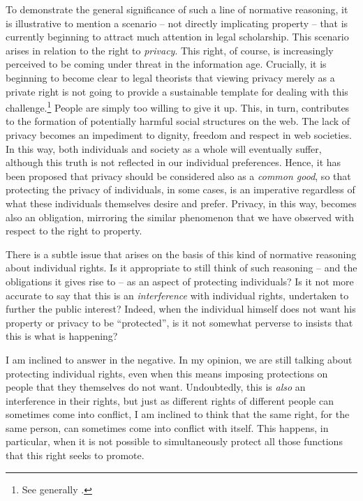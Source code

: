 To demonstrate the general significance of such a line of normative reasoning, it is illustrative to mention a scenario -- not directly implicating property -- that is currently beginning to attract much attention in legal scholarship. This scenario arises in relation to the right to {\it privacy}. This right, of course, is increasingly perceived to be coming under threat in the information age. Crucially, it is beginning to become clear to legal theorists that viewing privacy merely as a private right is not going to provide a sustainable template for dealing with this challenge.\footnote{See generally \cite{schafer14}.} People are simply too willing to give it up. This, in turn, contributes to the formation of potentially harmful social structures on the web. The lack of privacy becomes an impediment to dignity, freedom and respect in web societies. In this way, both individuals and society as a whole will eventually suffer, although this truth is not reflected in our individual preferences. Hence, it has been proposed that privacy should be considered also as a {\it common good}, so that protecting the privacy of individuals, in some cases, is an imperative regardless of what these individuals themselves desire and prefer. Privacy, in this way, becomes also an obligation, mirroring the similar phenomenon that we have observed with respect to the right to property.

There is a subtle issue that arises on the basis of this kind of normative reasoning about individual rights. Is it appropriate to still think of such reasoning -- and the obligations it gives rise to -- as an aspect of protecting individuals? Is it not more accurate to say that this is an {\it interference} with individual rights, undertaken to further the public interest? Indeed, when the individual himself does not want his property or privacy to be ``protected'', is it not somewhat perverse to insists that this is what is happening? 

I am inclined to answer in the negative. In my opinion, we are still talking about protecting individual rights, even when this means imposing protections on people that they themselves do not want. Undoubtedly, this is {\it also} an interference in their rights, but just as different rights of different people can sometimes come into conflict, I am inclined to think that the same right, for the same person, can sometimes come into conflict with itself. This happens, in particular, when it is not possible to simultaneously protect all those functions that this right seeks to promote. 

